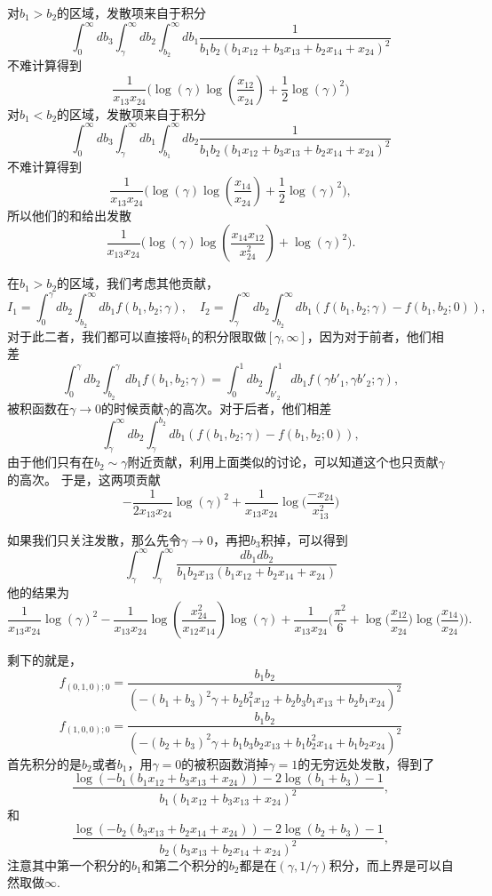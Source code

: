 \documentclass[11pt]{article}
\theoremstyle{definition}
\theoremstyle{plain}
\begin{document}
对$b_1>b_2$的区域，发散项来自于积分
\[
	\int_{0}^\infty db_3\int_{\gamma}^\infty db_2\int_{b_2}^\infty db_1\frac{1}{b_1 b_2 \left(b_1 x_{12}+b_3 x_{13}+b_2 x_{14}+x_{24}\right)^2}
\]
不难计算得到
\[
	\frac{1}{x_{13} x_{24}}\biggl(\log(\gamma) \log \left(\frac{x_{12}}{x_{24}}\right)+\frac 12\log(\gamma)^2\biggr)
\]
对$b_1<b_2$的区域，发散项来自于积分
\[
	\int_{0}^\infty db_3\int_{\gamma}^\infty db_1\int_{b_1}^\infty db_2\frac{1}{b_1 b_2 \left(b_1 x_{12}+b_3 x_{13}+b_2 x_{14}+x_{24}\right)^2}
\]
不难计算得到
\[
	\frac{1}{x_{13} x_{24}}\biggl(\log(\gamma) \log \left(\frac{x_{14}}{x_{24}}\right)+\frac 12\log(\gamma)^2\biggr),
\]
所以他们的和给出发散
\[
	\frac{1}{x_{13} x_{24}}\biggl(\log(\gamma) \log \left(\frac{x_{14}x_{12}}{x_{24}^2}\right)+\log(\gamma)^2\biggr).
\]

在$b_1>b_2$的区域，我们考虑其他贡献，
\[
I_1=\int_{0}^\gamma db_2\int_{b_2}^\infty db_1 f(b_1,b_2;\gamma),\quad 
I_2=\int_{\gamma}^\infty db_2\int_{b_2}^\infty db_1 (f(b_1,b_2;\gamma)-f(b_1,b_2;0)),
\]
对于此二者，我们都可以直接将$b_1$的积分限取做$[\gamma,\infty]$，因为对于前者，他们相差
\[
	\int_{0}^\gamma db_2\int_{b_2}^\gamma db_1 f(b_1,b_2;\gamma)=\int_{0}^1 db_2\int_{b'_2}^1 db_1 f(\gamma b'_1,\gamma b'_2;\gamma),
\]
被积函数在$\gamma\to 0$的时候贡献$\gamma$的高次。对于后者，他们相差
\[
	\int_{\gamma}^\infty db_2\int_{\gamma}^{b_2} db_1(f(b_1,b_2;\gamma)-f(b_1,b_2;0)),
\]
由于他们只有在$b_2\sim \gamma$附近贡献，利用上面类似的讨论，可以知道这个也只贡献$\gamma$的高次。
于是，这两项贡献
\[
	-\frac{1}{2x_{13} x_{24}}\log(\gamma)^2+\frac{1}{x_{13} x_{24}}\log\biggl(\frac{-x_{24}}{x_{13}^2}\biggr)
\]


如果我们只关注发散，那么先令$\gamma\to 0$，再把$b_3$积掉，可以得到
\[
	\int_{\gamma}^\infty\int_{\gamma}^\infty \frac{db_1db_2}{b_1 b_2 x_{13} \left(b_1 x_{12}+b_2 x_{14}+x_{24}\right)}
\]
他的结果为
\[
	\frac{1}{x_{13}x_{24}}\log(\gamma)^2-\frac{1}{x_{13} x_{24}}\log \left(\frac{x_{24}^2}{x_{12} x_{14}}\right)\log(\gamma)+\frac{1}{x_{13}x_{24}}\biggl(\frac{\pi^2}{6}+\log\biggl(\frac{x_{12}}{x_{24}}\biggr)\log\biggl(\frac{x_{14}}{x_{24}}\biggr)\biggr).
\]

剩下的就是，
\[
	f_{(0,1,0);0}=\frac{b_1 b_2}{\left(-\left(b_1+b_3\right)^2 \gamma +b_2 b_1^2 x_{12}+b_2 b_3 b_1 x_{13}+b_2 b_1 x_{24}\right)^2}
\]
\[
	f_{(1,0,0);0}=\frac{b_1 b_2}{\left(-\left(b_2+b_3\right)^2 \gamma +b_1 b_3 b_2 x_{13}+b_1 b_2^2 x_{14}+b_1 b_2 x_{24}\right)^2}
\]
首先积分的是$b_2$或者$b_1$，用$\gamma=0$的被积函数消掉$\gamma=1$的无穷远处发散，得到了
\[
	\frac{\log \left(-b_1 \left(b_1 x_{12}+b_3 x_{13}+x_{24}\right)\right)-2\log \left(b_1+b_3\right)-1}{b_1 \left(b_1 x_{12}+b_3 x_{13}+x_{24}\right)^2},
\]
和
\[
	\frac{\log \left(-b_2 \left(b_3 x_{13}+b_2 x_{14}+x_{24}\right)\right)-2\log \left(b_2+b_3\right)-1}{b_2 \left(b_3 x_{13}+b_2 x_{14}+x_{24}\right)^2},
\]
注意其中第一个积分的$b_1$和第二个积分的$b_2$都是在$(\gamma,1/\gamma)$积分，而上界是可以自然取做$\infty$. 
\end{document}
